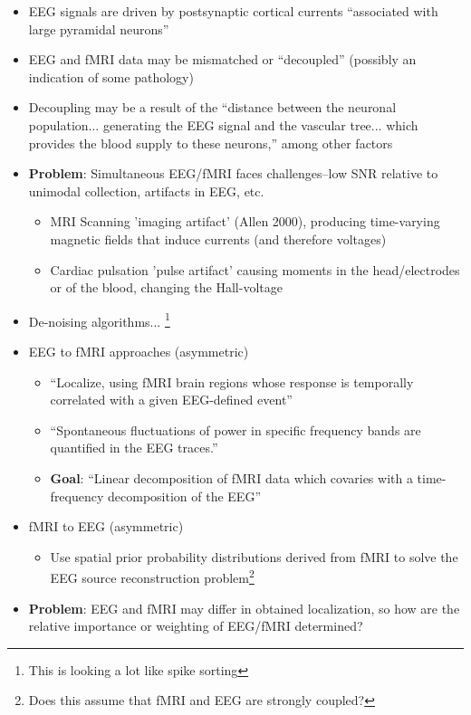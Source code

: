\documentclass{article}
\begin{document}
            \begin{itemize}
                \item EEG signals are driven by postsynaptic cortical currents 
    ``associated with
                large pyramidal neurons''
                \item EEG and fMRI data may be mismatched or ``decoupled''
(possibly an indication of some pathology)
                \item Decoupling may be a result of the ``distance between the
neuronal population... generating the EEG signal and the vascular tree... which
provides the blood supply to these neurons,'' among other factors
                \item \textbf{Problem}: Simultaneous EEG/fMRI faces
challenges--low SNR relative to unimodal collection, artifacts in EEG, etc.
                \begin{itemize}
                    \item MRI Scanning 'imaging artifact' (Allen 2000),
producing time-varying magnetic fields that induce currents (and therefore
voltages)
                    \item Cardiac pulsation 'pulse artifact' causing moments in
the head/electrodes or of the blood, changing the Hall-voltage
                \end{itemize}
                \item De-noising algorithms... \footnote{This is looking a lot
like spike sorting}
                \item EEG to fMRI approaches (asymmetric)
                \begin{itemize}
                    \item ``Localize, using fMRI brain regions whose response is
temporally correlated with a given EEG-defined event''
                    \item ``Spontaneous fluctuations of power in specific
frequency bands are quantified in the EEG traces.''
                    \item \textbf{Goal}: ``Linear decomposition of fMRI data
which covaries with a time-frequency decomposition of the EEG''
                \end{itemize}                    
                \item fMRI to EEG (asymmetric)
                \begin{itemize}
                    \item Use spatial prior probability distributions derived
from fMRI to solve the EEG source reconstruction problem\footnote{Does this
assume that fMRI and EEG are strongly coupled?}      
                \end{itemize}
                \item \textbf{Problem}: EEG and fMRI may differ in obtained
localization, so how are the relative importance or weighting of EEG/fMRI
determined?
            \end{itemize}
\end{document}
